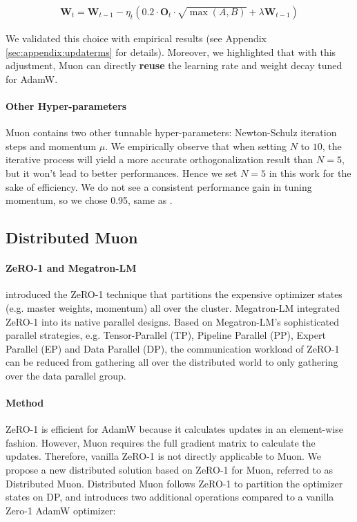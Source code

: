 \begin{align}
\mathbf{W}_t = \mathbf{W}_{t-1} - \eta_t (0.2\cdot\mathbf{O}_t\cdot\sqrt{\max(A,B)} + \lambda \mathbf{W}_{t-1})
\end{align}

 We validated this choice with empirical results (see Appendix \ref{sec:appendix:updaterms} for details). 
Moreover, we highlighted that with this adjustment, Muon can directly \textbf{reuse} the learning rate and weight decay tuned for AdamW. 

\paragraph{Other Hyper-parameters} Muon contains two other tunnable hyper-parameters: Newton-Schulz iteration steps and momentum $\mu$. We empirically observe that when setting $N$ to $10$, the iterative process will yield a more accurate orthogonalization result than $N=5$, but it won't lead to better performances. Hence we set $N = 5$ in this work for the sake of efficiency. We do not see a consistent performance gain in tuning momentum, so we chose 0.95, same as \cite{jordan2024muon}.

\subsection{Distributed Muon}
\label{sec:analysis:distrib}

\paragraph{ZeRO-1 and Megatron-LM}
\cite{Rajbhandari_2020} introduced the ZeRO-1 technique that partitions the expensive optimizer states (e.g. master weights, momentum) all over the cluster. Megatron-LM \citep{shoeybi2020megatronlmtrainingmultibillionparameter} integrated ZeRO-1 into its native parallel designs. Based on Megatron-LM's sophisticated parallel strategies, e.g. Tensor-Parallel (TP), Pipeline Parallel (PP), Expert Parallel (EP) and Data Parallel (DP), the communication workload of ZeRO-1 can be reduced from gathering all over the distributed world to only gathering over the data parallel group.

\paragraph{Method}
ZeRO-1 is efficient for AdamW because it calculates updates in an element-wise fashion. However, Muon requires the full gradient matrix to calculate the updates. Therefore, vanilla ZeRO-1 is not directly applicable to Muon. We propose a new distributed solution based on ZeRO-1 for Muon, referred to as Distributed Muon. Distributed Muon follows ZeRO-1 to partition the optimizer states on DP, and introduces two additional operations compared to a vanilla Zero-1 AdamW optimizer:

